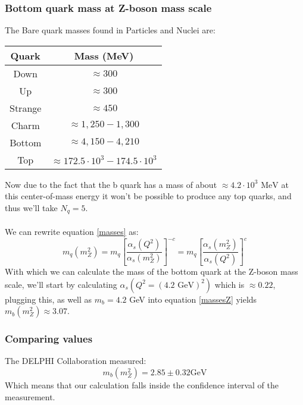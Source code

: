 \documentclass[10pt,a4paper,twoside]{article}
\begin{document}
\subsubsection*{Bottom quark mass at Z-boson mass scale}
The Bare quark masses found in Particles and Nuclei\cite{ParticlesAndNuclei} are:
\begin{center}
	\begin{tabular}{c|c}
		Quark & Mass (MeV)\\
		\hline
		Down & $\approx 300$\\
		Up & $\approx 300$\\
		Strange & $\approx 450$\\
		Charm & $\approx 1,250 - 1,300$\\
		Bottom & $\approx 4,150 - 4,210$\\
		Top & $\approx 172.5\cdot10^3 - 174.5\cdot10^3$\\
	\end{tabular} 
\end{center}
Now due to the fact that the b quark has a mass of about $\approx 4.2\cdot10^3\text{ MeV}$ at this center-of-mass energy it won't be possible to produce any top quarks, and thus we'll take $N_q = 5$.\\\\
We can rewrite equation \ref{masses} as:
\begin{equation}
	m_q(m_Z^2) = m_q\left[\frac{\alpha_s(Q^2)}{\alpha_s(m_Z^2)}\right]^{-c} = m_q\left[\frac{\alpha_s(m_Z^2)}{\alpha_s(Q^2)}\right]^{c}
	\label{massesZ}
\end{equation}
With which we can calculate the mass of the bottom quark at the Z-boson mass scale, we'll start by calculating $\alpha_s(Q^2 = (4.2 \text{ GeV})^2)$ which is $\approx 0.22$, plugging this, as well as $m_b = 4.2$ GeV into equation \ref{massesZ} yields $m_b(m_Z^2) \approx 3.07$.

\subsubsection*{Comparing values}
The DELPHI Collaboration measured\cite{Abdallah}:
\begin{equation}
	m_b(m_Z^2) = 2.85 \pm 0.32\text{GeV}
\end{equation}
Which means that our calculation falls inside the confidence interval of the measurement.
\end{document}
